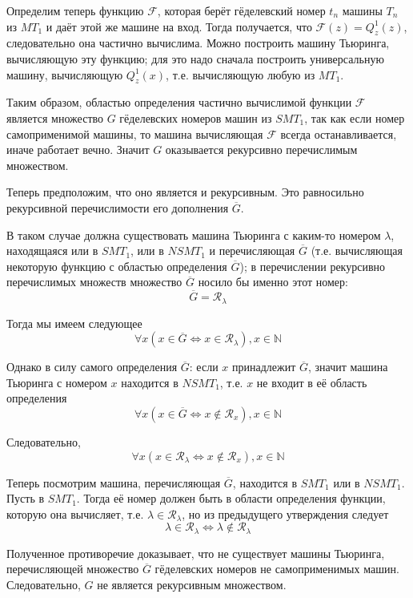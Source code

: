 \documentclass[a4paper, 12pt]{article}  %
\theoremstyle{definition}
\begin{document}
		Определим теперь функцию $\mathscr{F}$, которая берёт гёделевский номер $t_n$ машины $T_n$ из
		$MT_1$ и даёт этой же машине на вход. Тогда получается, что $\mathscr{F}(z) = Q^1_z(z)$,
		следовательно она частично вычислима. Можно построить машину Тьюринга, вычисляющую эту функцию; для
		это надо сначала построить универсальную машину, вычисляющую $Q^1_z(x)$, т.е. вычисляющую любую из
		$MT_1$.
		
		Таким образом, областью определения частично вычислимой функции $\mathscr{F}$ является множество
		$G$ гёделевских номеров машин из $SMT_1$, так как если номер самоприменимой машины, то машина
		вычисляющая $\mathscr{F}$ всегда останавливается, иначе работает вечно. Значит $G$ оказывается
		рекурсивно перечислимым множеством.
		
		Теперь предположим, что оно является и рекурсивным. Это равносильно рекурсивной перечислимости его
		дополнения $\overline{G}$.
		
		В таком случае должна существовать машина Тьюринга с каким-то номером $\lambda$, находящаяся или в
		$SMT_1$, или в $NSMT_1$ и перечисляющая $\overline{G}$ (т.е. вычисляющая некоторую функцию с
		областью определения $\overline{G}$); в перечислении рекурсивно перечислимых множеств
		множество $\overline{G}$ носило бы именно этот номер:
		$$ \overline{G} = \mathscr{R}_{\lambda} $$
		
		Тогда мы имеем следующее
		$$ \forall x ( x \in \overline{G} \Leftrightarrow  x \in \mathscr{R}_{\lambda} ), x \in \mathbb{N}$$
		
		Однако в силу самого определения $\overline{G}$: если $x$ принадлежит $\overline{G}$, значит машина
		Тьюринга с номером $x$ находится в $NSMT_1$, т.е. $x$ не входит в её область определения
		$$ \forall x (x \in \overline{G} \Leftrightarrow  x \notin \mathscr{R}_x ), x \in \mathbb{N}$$
		
		Следовательно,
		$$ \forall x (x \in \mathscr{R}_{\lambda} \Leftrightarrow  x \notin \mathscr{R}_x), x \in \mathbb{N} $$
		
		Теперь посмотрим машина, перечисляющая $\overline{G}$, находится в $SMT_1$ или в $NSMT_1$. Пусть в
		$SMT_1$. Тогда её номер должен быть в области определения функции, которую она вычисляет, т.е. 
		$\lambda \in \mathscr{R}_{\lambda}$, но из предыдущего утверждения следует 
		$$ \lambda \in \mathscr{R}_{\lambda} \Leftrightarrow  \lambda \notin \mathscr{R}_{\lambda}$$
		
		Полученное противоречие доказывает, что не существует машины Тьюринга, перечисляющей множество $\overline{G}$ гёделевских номеров не самоприменимых машин. Следовательно, $G$ не является рекурсивным множеством.
\end{document}
